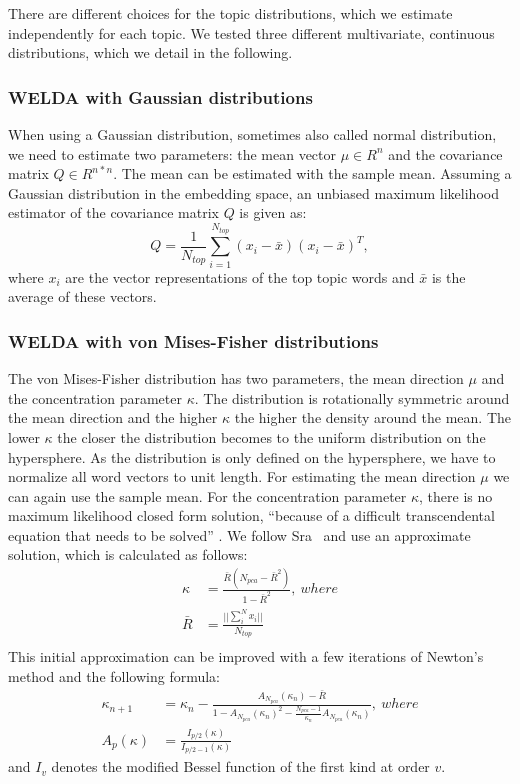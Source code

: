 \documentclass[
        a4paper,
        titlepage,
        twoside,
        parskip,
        numbers=noenddot
        ]{scrbook}
\theoremstyle{break}
\begin{document}
There are different choices for the topic distributions, which we estimate independently for each topic.
We tested three different multivariate, continuous distributions, which we detail in the following.

\subsubsection{WELDA with Gaussian distributions}

When using a Gaussian distribution, sometimes also called normal distribution, we need to estimate two parameters: the mean vector $\mu \in R^n$ and the covariance matrix $Q \in R^{n * n}$.
The mean can be estimated with the sample mean.
Assuming a Gaussian distribution in the embedding space, an unbiased maximum likelihood estimator of the covariance matrix $Q$ is given as:
\begin{equation*}
  Q = \frac{1}{N_{top}} \sum\limits_{i=1}^{N_{top}} (x_i - \bar{x}) (x_i - \bar{x})^T,
\end{equation*}
where $x_i$ are the vector representations of the top topic words and $\bar{x}$ is the average of these vectors.
\subsubsection{WELDA with von Mises-Fisher distributions}
The von Mises-Fisher distribution has two parameters, the mean direction $\mu$ and the concentration parameter $\kappa$.
The distribution is rotationally symmetric around the mean direction and the higher $\kappa$ the higher the density around the mean.
The lower $\kappa$ the closer the distribution becomes to the uniform distribution on the hypersphere.
As the distribution is only defined on the hypersphere, we have to normalize all word vectors to unit length.
For estimating the mean direction $\mu$ we can again use the sample mean.
For the concentration parameter $\kappa$, there is no maximum likelihood closed form solution, ``because of a difficult transcendental equation that needs to be solved'' \cite{Sra2012}.
We follow Sra~\cite{Sra2012} and use an approximate solution, which is calculated as follows:
\begin{align*}
  \kappa &= \frac{\bar{R}(N_{pca} - \bar{R}^2)}{1 - \bar{R}^2},~where \\
  \bar{R} &= \frac{|| \sum_{i}^{N} x_i ||}{N_{top}} \\
\end{align*}
This initial approximation can be improved with a few iterations of Newton's method and the following formula:
\begin{align*}
  \kappa_{n + 1} &= \kappa_n - \frac{A_{N_{pca}}(\kappa_n)-\bar{R}}{1-A_{N_{pca}}(\kappa_n)^2-\frac{N_{pca}-1}{\kappa_n}A_{N_{pca}}(\kappa_n)},~where \\
  A_{p}(\kappa) &= \frac {I_{p/2}(\kappa)} {I_{p/2-1}(\kappa)}
\end{align*}
and $I_{v}$ denotes the modified Bessel function of the first kind at order $v$.
\end{document}
